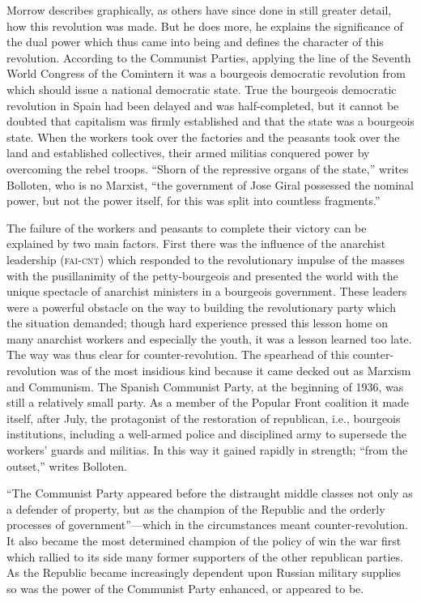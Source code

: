 Morrow describes graphically, as others have since done in still greater detail, how this revolution was made. But he does more, he explains the significance of the dual power which thus came into being and defines the character of this revolution. According to the Communist Parties, applying the line of the Seventh World Congress of the Comintern\label{en:BollotenGrandCamouflageP42} it was a bourgeois democratic revolution from which should issue a national democratic state. True the bourgeois democratic revolution in Spain had been delayed and was half-completed, but it cannot be doubted that capitalism was firmly established and that the state was a bourgeois state. When the workers took over the factories and the peasants took over the land and established collectives, their armed militias conquered power by overcoming the rebel troops. ``Shorn of the repressive organs of the state,'' writes Bolloten, who is no Marxist, ``the government of Jose Giral possessed the nominal power, but not the power itself, for this was split into countless fragments.''\endnotemark[\ref{en:BollotenGrandCamouflageP42}]

The failure of the workers and peasants to complete their victory can be explained by two main factors. First there was the influence of the anarchist leadership (\textsc{fai-cnt}) which responded to the revolutionary impulse of the masses with the pusillanimity of the petty-bourgeois and presented the world with the unique spectacle of anarchist ministers in a bourgeois government. These leaders were a powerful obstacle on the way to building the revolutionary party which the situation demanded; though hard experience pressed this lesson home on many anarchist workers and especially the youth, it was a lesson learned too late. The way was thus clear for counter-revolution. The spearhead of this counter-revolution was of the most insidious kind because it came decked out as Marxism and Communism. The Spanish Communist Party, at the beginning of 1936, was still a relatively small party. As a member of the Popular Front coalition it made itself, after July, the protagonist of the restoration of republican, i.e., bourgeois institutions, including a well-armed police and disciplined army to supersede the workers’ guards and militias. In this way it gained rapidly in strength; ``from the outset,'' writes Bolloten.

``The Communist Party appeared before the distraught middle classes not only as a defender of property, but as the champion of the Republic and the orderly processes of government''---which in the circumstances meant counter-revolution. It also became the most determined champion of the policy of win the war first which rallied to its side many former supporters of the other republican parties. As the Republic became increasingly dependent upon Russian military supplies so was the power of the Communist Party enhanced, or appeared to be.

